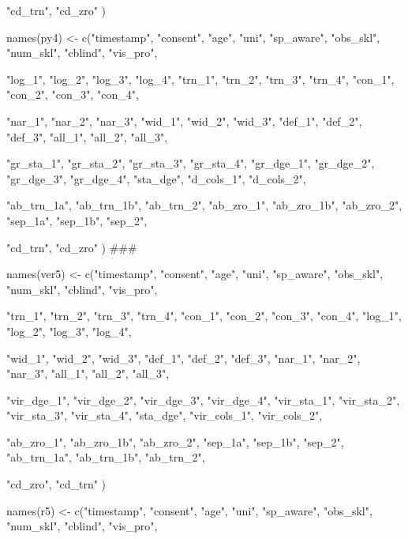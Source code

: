 \documentclass{article}
\begin{document}
                 "cd_trn",
                 "cd_zro"
                 )

names(py4) <- c("timestamp", "consent", "age", "uni", "sp_aware", "obs_skl", "num_skl", "cblind", "vis_pro",
                 
                 "log_1", "log_2", "log_3", "log_4",
                 "trn_1", "trn_2", "trn_3", "trn_4",
                 "con_1", "con_2", "con_3", "con_4", 
  
                 "nar_1", "nar_2", "nar_3", 
                 "wid_1", "wid_2", "wid_3",
                 "def_1", "def_2", "def_3", 
                 "all_1", "all_2", "all_3",
  
                 "gr_sta_1", "gr_sta_2", "gr_sta_3", "gr_sta_4",
                 "gr_dge_1", "gr_dge_2", "gr_dge_3", "gr_dge_4",  
                 "sta_dge",
                 "d_cols_1", "d_cols_2", 
  
                 "ab_trn_1a", "ab_trn_1b", "ab_trn_2", 
                 "ab_zro_1", "ab_zro_1b", "ab_zro_2",
                 "sep_1a", "sep_1b", "sep_2",

                 "cd_trn",
                 "cd_zro"
                 )
###

names(ver5) <- c("timestamp", "consent", "age", "uni", "sp_aware", "obs_skl", "num_skl", "cblind", "vis_pro",
                 
                 "trn_1", "trn_2", "trn_3", "trn_4",
                 "con_1", "con_2", "con_3", "con_4",
                 "log_1", "log_2", "log_3", "log_4", 
                 
                 "wid_1", "wid_2", "wid_3",
                 "def_1", "def_2", "def_3", 
                 "nar_1", "nar_2", "nar_3", 
                 "all_1", "all_2", "all_3",
  
                 "vir_dge_1", "vir_dge_2", "vir_dge_3", "vir_dge_4",
                 "vir_sta_1", "vir_sta_2", "vir_sta_3", "vir_sta_4", 
                 "sta_dge",
                 "vir_cols_1", "vir_cols_2", 
  
                 "ab_zro_1", "ab_zro_1b", "ab_zro_2",
                 "sep_1a", "sep_1b", "sep_2",
                 "ab_trn_1a", "ab_trn_1b", "ab_trn_2", 
                 
                 "cd_zro",
                 "cd_trn"
                 )

names(r5) <- c("timestamp", "consent", "age", "uni", "sp_aware", "obs_skl", "num_skl", "cblind", "vis_pro",
                 
\end{document}
